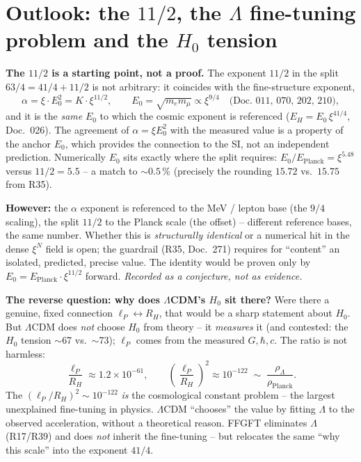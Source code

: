 \section{Outlook: the $11/2$, the $\Lambda$ fine-tuning problem and the $H_0$ tension}

\textbf{The $11/2$ is a starting point, not a proof.} The exponent $11/2$ in
the split $63/4 = 41/4 + 11/2$ is not arbitrary: it coincides with the
fine-structure exponent,
\begin{equation}
  \alpha = \xi\cdot E_0^2 = K\cdot\xi^{11/2},\qquad E_0=\sqrt{m_e m_\mu}\propto\xi^{9/4}
  \quad\text{(Doc.~011, 070, 202, 210)},
\end{equation}
and it is the \emph{same} $E_0$ to which the cosmic exponent is referenced
($E_H=E_0\,\xi^{41/4}$, Doc.~026). The agreement of $\alpha=\xi E_0^2$ with the
measured value is a property of the anchor $E_0$, which provides the connection
to the SI, not an independent prediction. Numerically $E_0$ sits exactly where the
split requires: $E_0/E_\text{Planck}=\xi^{5.48}$ versus $11/2=5.5$ --
a match to $\sim0.5\,\%$ (precisely the rounding $15.72$ vs.\ $15.75$
from R35).

\textbf{However:} the $\alpha$ exponent is referenced to the MeV / lepton base
(the $9/4$ scaling), the split $11/2$ to the Planck scale (the offset) --
different reference bases, the same number. Whether this is \emph{structurally
identical} or a numerical hit in the dense $\xi^N$ field is open; the guardrail
(R35, Doc.~271) requires for \enquote{content} an isolated, predicted, precise
value. The identity would be proven only by $E_0 = E_\text{Planck}\cdot\xi^{11/2}$
forward. \emph{Recorded as a conjecture, not as evidence.}

\textbf{The reverse question: why does $\Lambda$CDM's $H_0$ sit there?} Were
there a genuine, fixed connection $\ell_P\leftrightarrow R_H$, that would be a
sharp statement about $H_0$. But $\Lambda$CDM does \emph{not} choose $H_0$ from
theory -- it \emph{measures} it (and contested: the $H_0$ tension $\sim$67
vs.\ $\sim$73); $\ell_P$ comes from the measured $G,\hbar,c$. The ratio is not
harmless:
\begin{equation}
  \frac{\ell_P}{R_H}\approx 1.2\times10^{-61},
  \qquad
  \left(\frac{\ell_P}{R_H}\right)^2\approx10^{-122}
  \;\sim\;\frac{\rho_\Lambda}{\rho_\text{Planck}}.
\end{equation}
The $(\ell_P/R_H)^2\sim10^{-122}$ \emph{is} the cosmological constant problem --
the largest unexplained fine-tuning in physics. $\Lambda$CDM \enquote{chooses}
the value by fitting $\Lambda$ to the observed acceleration, without a
theoretical reason. FFGFT eliminates $\Lambda$ (R17/R39) and does \emph{not}
inherit the fine-tuning -- but relocates the same \enquote{why this scale} into
the exponent $41/4$.


